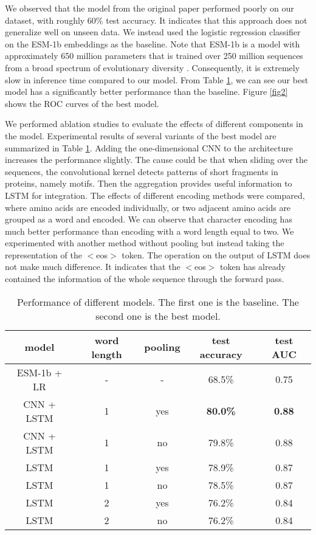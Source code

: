 \documentclass[conference]{IEEEtran}
\begin{document}
We observed that the model from the original paper \cite{Yang_2021} performed poorly on our dataset, with roughly 60\% test accuracy. It indicates that this approach does not generalize well on unseen data. We instead used the logistic regression classifier on the ESM-1b embeddings as the baseline. Note that ESM-1b is a model with approximately 650 million parameters that is trained over 250 million sequences from a broad spectrum of evolutionary diversity \cite{Rives_2021}. Consequently, it is extremely slow in inference time compared to our model. From Table \ref{tab1}, we can see our best model has a significantly better performance than the baseline. Figure \ref{fig2} shows the ROC curves of the best model.

We performed ablation studies to evaluate the effects of different components in the model. Experimental results of several variants of the best model are summarized in Table \ref{tab1}. Adding the one-dimensional CNN to the architecture increases the performance slightly. The cause could be that when sliding over the sequences, the convolutional kernel detects patterns of short fragments in proteins, namely motifs. Then the aggregation provides useful information to LSTM for integration. The effects of different encoding methods were compared, where amino acids are encoded individually, or two adjacent amino acids are grouped as a word and encoded. We can observe that character encoding has much better performance than encoding with a word length equal to two. We experimented with another method without pooling but instead taking the representation of the $<$eos$>$ token. The operation on the output of LSTM does not make much difference. It indicates that the $<$eos$>$ token has already contained the information of the whole sequence through the forward pass.

\begin{table}
\caption{Performance of different models. The first one is the baseline. The second one is the best model.}
\label{tab1}
\begin{center}
\begin{tabular}{|c|c|c|c|c|}
\hline
model & word length & pooling & test accuracy & test AUC\\
\hline
ESM-1b + LR & - & - & 68.5\% & 0.75 \\
CNN + LSTM & 1 & yes & \textbf{80.0\%} & \textbf{0.88} \\
CNN + LSTM & 1 & no & 79.8\% & 0.88 \\
LSTM & 1 & yes & 78.9\% & 0.87 \\
LSTM & 1 & no & 78.5\% & 0.87 \\
LSTM & 2 & yes & 76.2\% & 0.84 \\
LSTM & 2 & no & 76.2\% & 0.84 \\
\hline
\end{tabular}
\end{center}
\end{table}
\end{document}
